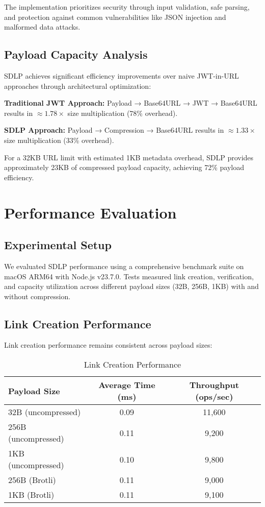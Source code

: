 \documentclass[conference]{IEEEtran}
\begin{document}
The implementation prioritizes security through input validation, safe parsing, and protection against common vulnerabilities like JSON injection and malformed data attacks.

\subsection{Payload Capacity Analysis}

SDLP achieves significant efficiency improvements over naive JWT-in-URL approaches through architectural optimization:

\textbf{Traditional JWT Approach:} Payload → Base64URL → JWT → Base64URL results in $\approx 1.78\times$ size multiplication (78\% overhead).

\textbf{SDLP Approach:} Payload → Compression → Base64URL results in $\approx 1.33\times$ size multiplication (33\% overhead).

For a 32KB URL limit with estimated 1KB metadata overhead, SDLP provides approximately 23KB of compressed payload capacity, achieving 72\% payload efficiency.

\section{Performance Evaluation}

\subsection{Experimental Setup}

We evaluated SDLP performance using a comprehensive benchmark suite on macOS ARM64 with Node.js v23.7.0. Tests measured link creation, verification, and capacity utilization across different payload sizes (32B, 256B, 1KB) with and without compression.

\subsection{Link Creation Performance}

Link creation performance remains consistent across payload sizes:

\begin{table}[!t]
\caption{Link Creation Performance}
\label{tab:creation-performance}
\centering
\begin{tabular}{@{}lcc@{}}
\toprule
Payload Size & Average Time (ms) & Throughput (ops/sec) \\
\midrule
32B (uncompressed) & 0.09 & 11,600 \\
256B (uncompressed) & 0.11 & 9,200 \\
1KB (uncompressed) & 0.10 & 9,800 \\
256B (Brotli) & 0.11 & 9,000 \\
1KB (Brotli) & 0.11 & 9,100 \\
\bottomrule
\end{tabular}
\end{table}
\end{document}
